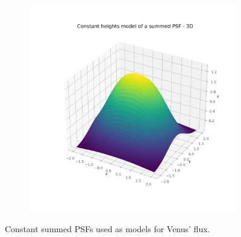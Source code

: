 \begin{figure}[H]
\begin{subfigure}{.45\textwidth}
            \includegraphics[width=\textwidth]{report/Figures/models/model_psf_const_3d.png}
        \end{subfigure}
        \caption{Constant summed PSFs used as models for Venus' flux.}
        \label{model_psf_const}
        \end{figure}




